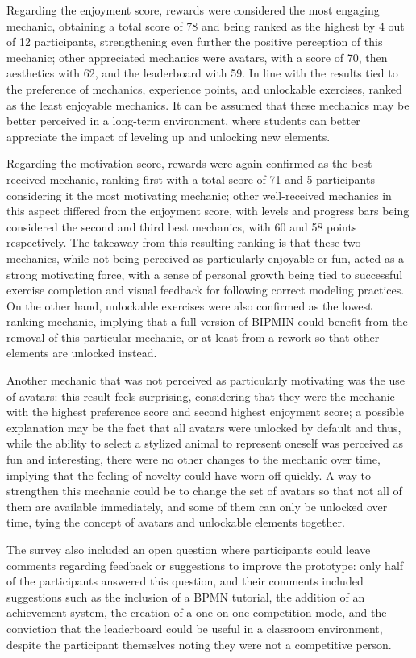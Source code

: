 Regarding the enjoyment score, rewards were considered the most engaging mechanic, obtaining a total score of 78 and being ranked as the highest by 4 out of 12 participants, strengthening even further the positive perception of this mechanic; other appreciated mechanics were avatars, with a score of 70, then aesthetics with 62, and the leaderboard with 59. In line with the results tied to the preference of mechanics, experience points, and unlockable exercises, ranked as the least enjoyable mechanics. It can be assumed that these mechanics may be better perceived in a long-term environment, where students can better appreciate the impact of leveling up and unlocking new elements.

Regarding the motivation score, rewards were again confirmed as the best received mechanic, ranking first with a total score of 71 and 5 participants considering it the most motivating mechanic; other well-received mechanics in this aspect differed from the enjoyment score, with levels and progress bars being considered the second and third best mechanics, with 60 and 58 points respectively. The takeaway from this resulting ranking is that these two mechanics, while not being perceived as particularly enjoyable or fun, acted as a strong motivating force, with a sense of personal growth being tied to successful exercise completion and visual feedback for following correct modeling practices. On the other hand, unlockable exercises were also confirmed as the lowest ranking mechanic, implying that a full version of BIPMIN could benefit from the removal of this particular mechanic, or at least from a rework so that other elements are unlocked instead. 

Another mechanic that was not perceived as particularly motivating was the use of avatars: this result feels surprising, considering that they were the mechanic with the highest preference score and second highest enjoyment score; a possible explanation may be the fact that all avatars were unlocked by default and thus, while the ability to select a stylized animal to represent oneself was perceived as fun and interesting, there were no other changes to the mechanic over time, implying that the feeling of novelty could have worn off quickly. A way to strengthen this mechanic could be to change the set of avatars so that not all of them are available immediately, and some of them can only be unlocked over time, tying the concept of avatars and unlockable elements together.

The survey also included an open question where participants could leave comments regarding feedback or suggestions to improve the prototype: only half of the participants answered this question, and their comments included suggestions such as the inclusion of a BPMN tutorial, the addition of an achievement system, the creation of a one-on-one competition mode, and the conviction that the leaderboard could be useful in a classroom environment, despite the participant themselves noting they were not a competitive person.

